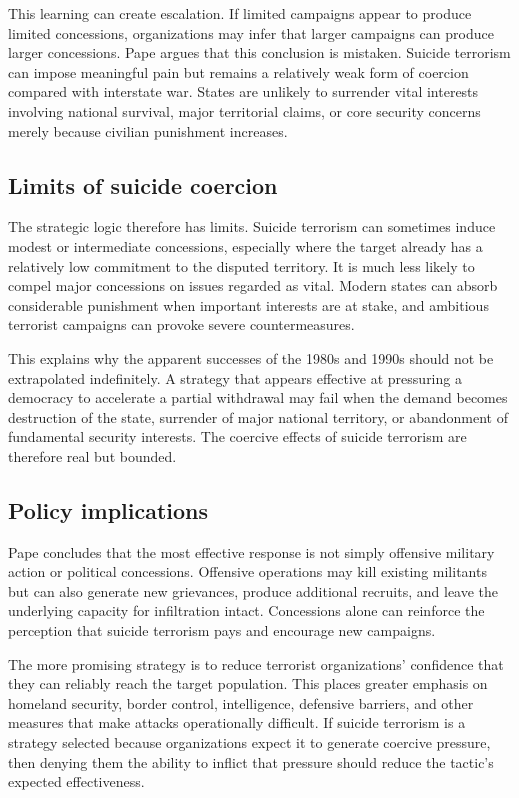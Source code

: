 This learning can create escalation. If limited campaigns appear to produce limited concessions, organizations may infer that larger campaigns can produce larger concessions. Pape argues that this conclusion is mistaken. Suicide terrorism can impose meaningful pain but remains a relatively weak form of coercion compared with interstate war. States are unlikely to surrender vital interests involving national survival, major territorial claims, or core security concerns merely because civilian punishment increases.

\subsection{Limits of suicide coercion}

The strategic logic therefore has limits. Suicide terrorism can sometimes induce modest or intermediate concessions, especially where the target already has a relatively low commitment to the disputed territory. It is much less likely to compel major concessions on issues regarded as vital. Modern states can absorb considerable punishment when important interests are at stake, and ambitious terrorist campaigns can provoke severe countermeasures.

This explains why the apparent successes of the 1980s and 1990s should not be extrapolated indefinitely. A strategy that appears effective at pressuring a democracy to accelerate a partial withdrawal may fail when the demand becomes destruction of the state, surrender of major national territory, or abandonment of fundamental security interests. The coercive effects of suicide terrorism are therefore real but bounded.

\subsection{Policy implications}

Pape concludes that the most effective response is not simply offensive military action or political concessions. Offensive operations may kill existing militants but can also generate new grievances, produce additional recruits, and leave the underlying capacity for infiltration intact. Concessions alone can reinforce the perception that suicide terrorism pays and encourage new campaigns.

The more promising strategy is to reduce terrorist organizations' confidence that they can reliably reach the target population. This places greater emphasis on homeland security, border control, intelligence, defensive barriers, and other measures that make attacks operationally difficult. If suicide terrorism is a strategy selected because organizations expect it to generate coercive pressure, then denying them the ability to inflict that pressure should reduce the tactic's expected effectiveness.


